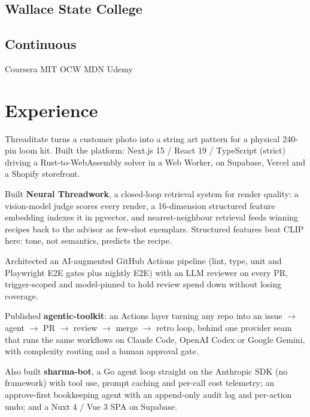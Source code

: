\documentclass[]{pb-resume-openfonts}
\begin{document}
\begin{minipage}[t]{0.33\textwidth}
\subsection{Wallace State College}
\sectionsep

\subsection{Continuous}
Coursera \textbullet{} MIT OCW \textbullet{} MDN \textbullet{} Udemy
\sectionsep

%
%

\end{minipage}
\hfill
\begin{minipage}[t]{0.66\textwidth}

\section{Experience}
\vspace{\topsep} %
\begin{tightemize}

\item Threaditate turns a customer photo into a string art pattern for a physical 240-pin loom kit. Built the platform: Next.js 15 / React 19 / TypeScript (strict) driving a Rust-to-WebAssembly solver in a Web Worker, on Supabase, Vercel and a Shopify storefront.
\item Built \textbf{Neural Threadwork}, a closed-loop retrieval system for render quality: a vision-model judge scores every render, a 16-dimension structured feature embedding indexes it in pgvector, and nearest-neighbour retrieval feeds winning recipes back to the advisor as few-shot exemplars. Structured features beat CLIP here: tone, not semantics, predicts the recipe.
\item Architected an AI-augmented GitHub Actions pipeline (lint, type, unit and Playwright E2E gates plus nightly E2E) with an LLM reviewer on every PR, trigger-scoped and model-pinned to hold review spend down without losing coverage.
\item Published \textbf{agentic-toolkit}: an Actions layer turning any repo into an issue $\rightarrow$ agent $\rightarrow$ PR $\rightarrow$ review $\rightarrow$ merge $\rightarrow$ retro loop, behind one provider seam that runs the same workflows on Claude Code, OpenAI Codex or Google Gemini, with complexity routing and a human approval gate.
\item Also built \textbf{sharma-bot}, a Go agent loop straight on the Anthropic SDK (no framework) with tool use, prompt caching and per-call cost telemetry; an approve-first bookkeeping agent with an append-only audit log and per-action undo; and a Nuxt 4 / Vue 3 SPA on Supabase.


\end{tightemize}
\end{minipage}
\end{document}
